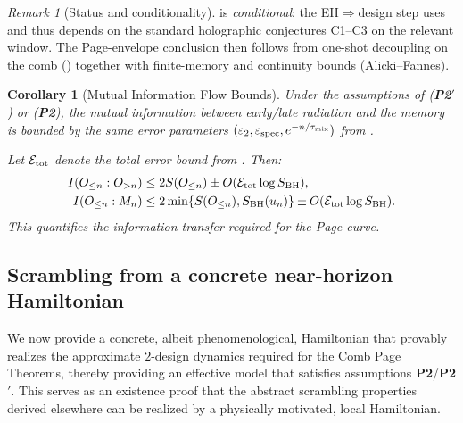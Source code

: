 \documentclass[11pt,a4paper]{article}
\newcommand{\Ptwo}{\textbf{P2}\xspace}
\newcommand{\PtwoPrime}{\textbf{P2$'$}\xspace}
\theoremstyle{plain}
\newtheorem{corollary}[theorem]{Corollary}
\theoremstyle{definition}
\theoremstyle{remark}
\newtheorem{remark}[theorem]{Remark}
\begin{document}
\begin{remark}[Status and conditionality]
 is \emph{conditional}: the EH$\Rightarrow$design step uses  and thus depends on the standard holographic conjectures C1--C3 on the relevant window.
The Page-envelope conclusion then follows from one-shot decoupling on the comb () together with finite-memory and continuity bounds (Alicki--Fannes).
\end{remark}

\begin{corollary}[Mutual Information Flow Bounds]
Under the assumptions of  (\PtwoPrime) or  (\Ptwo), the mutual information between early/late radiation and the memory is bounded by the same error parameters $(\varepsilon_2, \varepsilon_{\rm spec}, e^{-n/\tau_{\rm mix}})$ from .

Let $\mathcal{E}_{\rm tot}$ denote the total error bound from . Then:
\begin{align}
    I(O_{\le n} : O_{>n}) &\le 2 S(O_{\le n}) \pm O(\mathcal{E}_{\rm tot} \log S_{\rm BH}), \\
    I(O_{\le n} : M_n) &\le 2 \min\{S(O_{\le n}), S_{\rm BH}(u_n)\} \pm O(\mathcal{E}_{\rm tot} \log S_{\rm BH}).
\end{align}
This quantifies the information transfer required for the Page curve.
\end{corollary}

\subsection{Scrambling from a concrete near-horizon Hamiltonian}
\label{ssec:grav-scrambling}
We now provide a concrete, albeit phenomenological, Hamiltonian that provably realizes the approximate $2$-design dynamics required for the Comb Page Theorems, thereby providing an effective model that satisfies assumptions \Ptwo/\PtwoPrime.
This serves as an existence proof that the abstract scrambling properties derived elsewhere can be realized by a physically motivated, local Hamiltonian.
\end{document}
